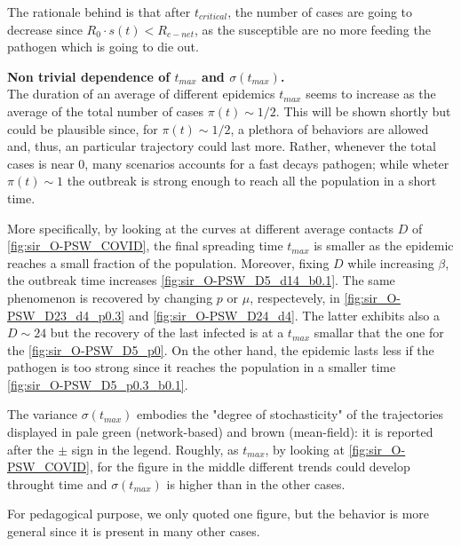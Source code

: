 \documentclass[a4paper,10pt,twoside]{book} %
\theoremstyle{definition}
\begin{document}
The rationale behind is that after $ t_{critical}$, the number of cases are going to decrease since $R_0 \cdot s(t) < R_{c-net}$, as the susceptible are no more feeding the pathogen which is going to die out.

\textbf{Non trivial dependence of $ t_{max}$ and $ \sigma(t_{max})$.} \\
The duration of an average of different epidemics $t_{max}$ seems to increase as the average of the total number of cases $\pi(t) \sim 1/2$. This will be shown shortly but could be plausible since, for $ \pi(t) \sim 1/2$, a plethora of behaviors are allowed and, thus, an particular trajectory could last more.
Rather, whenever the total cases is near $ 0$, many scenarios accounts for a fast decays pathogen; while wheter $ \pi(t) \sim 1$ the outbreak is strong enough to reach all the population in a short time.

More specifically, by looking at the curves at different average contacts $D$ of \autoref{fig:sir_O-PSW_COVID}, the final spreading time $ t_{max}$ is smaller as the epidemic reaches a small fraction of the population. Moreover, fixing $D$ while increasing $ \beta$, the outbreak time increases \autoref{fig:sir_O-PSW_D5_d14_b0.1}. The same phenomenon is recovered by changing $ p$ or $ \mu$, respectevely, in \autoref{fig:sir_O-PSW_D23_d4_p0.3} and \autoref{fig:sir_O-PSW_D24_d4}. The latter exhibits also a $ D \sim 24$ but the recovery of the last infected is at a $t_{max}$ smallar that the one for the  \autoref{fig:sir_O-PSW_D5_p0}. On the other hand, the epidemic lasts less if the pathogen is too strong since it reaches the population in a smaller time \autoref{fig:sir_O-PSW_D5_p0.3_b0.1}.

The variance $\sigma(t_{max})$ embodies the "degree of stochasticity" of the trajectories displayed in pale green (network-based) and brown (mean-field): it is reported after the $\pm$ sign in the legend. 
Roughly, as $ t_{max}$, by looking at \autoref{fig:sir_O-PSW_COVID}, for the figure in the middle different trends could develop throught time and $ \sigma(t_{max})$ is higher than in the other cases.

For pedagogical purpose, we only quoted one figure, but the behavior is more general since it is present in many other cases.
\end{document}

